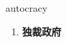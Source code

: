 
\begin{frame}
{\huge autocracy}
\begin{center}
\begin{enumerate}\Large
  \item \textbf{独裁政府}
\end{enumerate}
\end{center}
\end{frame}
